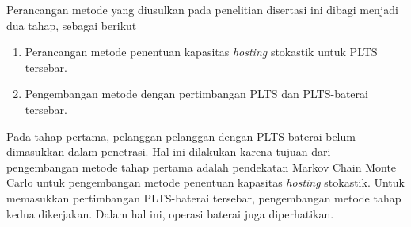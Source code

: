 Perancangan metode yang diusulkan pada penelitian disertasi ini dibagi menjadi dua tahap, sebagai berikut
\begin{enumerate}
	\item Perancangan metode penentuan kapasitas \textit{\textit{hosting}} stokastik untuk PLTS tersebar.
	\item Pengembangan metode dengan pertimbangan PLTS dan PLTS-baterai tersebar.
\end{enumerate}

Pada tahap pertama, pelanggan-pelanggan dengan PLTS-baterai belum dimasukkan dalam penetrasi. Hal ini dilakukan karena tujuan dari pengembangan metode tahap pertama adalah pendekatan Markov Chain Monte Carlo untuk pengembangan metode penentuan kapasitas \textit{\textit{hosting}} stokastik. Untuk memasukkan pertimbangan PLTS-baterai tersebar, pengembangan metode tahap kedua dikerjakan. Dalam hal ini, operasi baterai juga diperhatikan.

